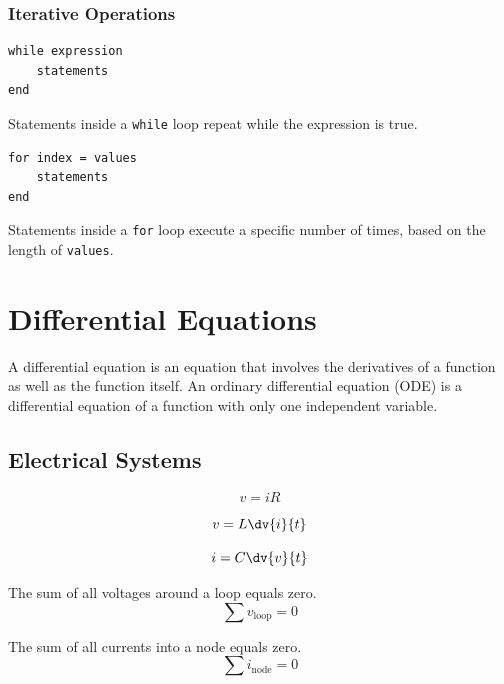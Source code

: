 \documentclass{article}
\begin{document}
\subsubsection{Iterative Operations}
\begin{multicols}{2}
    \begin{lstlisting}
while expression
    statements
end
    \end{lstlisting}
    \columnbreak
    Statements inside a \lstinline{while} loop repeat while the expression is true.
\end{multicols}
\begin{multicols}{2}
    \begin{lstlisting}
for index = values
    statements
end
    \end{lstlisting}
    \columnbreak
    Statements inside a \lstinline{for} loop execute a specific number of times, based on the length of \lstinline{values}.
\end{multicols}
\section{Differential Equations}
\begin{definition}
    A differential equation is an equation that involves the derivatives of a function as well as the function itself.
    An ordinary differential equation (ODE) is a differential equation of a function with only one independent variable.
\end{definition}
\subsection{Electrical Systems}
\begin{theorem}
    \begin{equation*}
        v = i R
    \end{equation*}
\end{theorem}
\begin{theorem}
    \begin{equation*}
        v = L \dv{i}{t}
    \end{equation*}
\end{theorem}
\begin{theorem}
    \begin{equation*}
        i = C \dv{v}{t}
    \end{equation*}
\end{theorem}
\begin{theorem}
    The sum of all voltages around a loop equals zero.
    \begin{equation*}
        \sum v_{\mathrm{loop}} = 0
    \end{equation*}
\end{theorem}
\begin{theorem}
    The sum of all currents into a node equals zero.
    \begin{equation*}
        \sum i_{\mathrm{node}} = 0
    \end{equation*}
\end{theorem}
\end{document}
